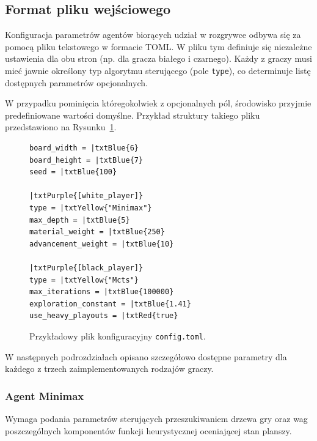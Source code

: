 \documentclass{article}
\begin{document}
\subsection{Format pliku wejściowego}

Konfiguracja parametrów agentów biorących udział w rozgrywce odbywa się za pomocą pliku tekstowego w formacie TOML. W pliku tym definiuje się niezależne ustawienia dla obu stron (np. dla gracza białego i czarnego). Każdy z graczy musi mieć jawnie określony typ algorytmu sterującego (pole \texttt{type}), co determinuje listę dostępnych parametrów opcjonalnych. 

W przypadku pominięcia któregokolwiek z opcjonalnych pól, środowisko przyjmie predefiniowane wartości domyślne. Przykład struktury takiego pliku przedstawiono na Rysunku~\ref{fig:config-example}.

\begin{figure}[H]
\small
\centering
\begin{Verbatim}[commandchars=\|\{\}]
board_width = |txtBlue{6}
board_height = |txtBlue{7}
seed = |txtBlue{100}

|txtPurple{[white_player]}
type = |txtYellow{"Minimax"}
max_depth = |txtBlue{5}
material_weight = |txtBlue{250}
advancement_weight = |txtBlue{10}

|txtPurple{[black_player]}
type = |txtYellow{"Mcts"}
max_iterations = |txtBlue{100000}
exploration_constant = |txtBlue{1.41}
use_heavy_playouts = |txtRed{true}
\end{Verbatim}
\caption{Przykładowy plik konfiguracyjny \texttt{config.toml}.}
\label{fig:config-example}
\end{figure}

\noindent
W następnych podrozdziałach opisano szczegółowo dostępne parametry dla każdego z trzech zaimplementowanych rodzajów graczy.

\subsubsection{Agent Minimax}

Wymaga podania parametrów sterujących przeszukiwaniem drzewa gry oraz wag poszczególnych komponentów funkcji heurystycznej oceniającej stan planszy.
\end{document}
